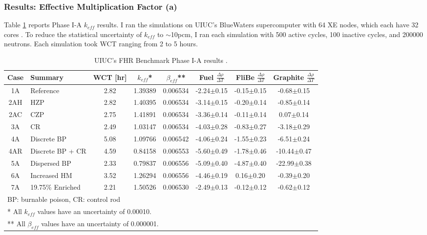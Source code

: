 \subsubsection{Results: Effective Multiplication Factor (a)}
\label{sec:fhr-benchmark-keff}
Table \ref{tab:phase1a-results} reports Phase I-A $k_{eff}$ results. 
I ran the simulations on \gls{UIUC}'s BlueWaters supercomputer with 64 XE nodes, 
which each have 32 cores \cite{ncsa_about_2017}. 
To reduce the statistical uncertainty of $k_{eff}$ to $\sim$10pcm, I ran each 
simulation with 500 active cycles, 100 inactive cycles, and 200000 neutrons. 
Each simulation took \gls{WCT} ranging from 2 to 5 hours. 
\begin{table}[htbp]
    \centering
    \onehalfspacing
    \caption{\gls{UIUC}'s \acrlong{FHR} Benchmark Phase I-A results 
    \cite{chee_arfcfhr-benchmark_2021}.}
	\label{tab:phase1a-results}
    \footnotesize
    \begin{tabular}{cp{2.7cm}cccccc}
    \hline
    \textbf{Case} & \textbf{Summary} & \textbf{WCT [hr]} & \textbf{$k_{eff}$}* & 
    \textbf{$\beta_{eff}$}** & 
    \textbf{Fuel} $\frac{\Delta \rho}{\Delta T}$ & 
    \textbf{FliBe} $\frac{\Delta \rho}{\Delta T}$ & 
    \textbf{Graphite} $\frac{\Delta \rho}{\Delta T}$\\
    \hline 
    1A & Reference &2.82&1.39389 & 0.006534 & -2.24$\pm$0.15 & -0.15$\pm$0.15 & -0.68$\pm$0.15\\
    2AH & \gls{HZP} &2.82&1.40395 & 0.006534 & -3.14$\pm$0.15 & -0.20$\pm$0.14 & -0.85$\pm$0.14\\
    2AC & \gls{CZP} &2.75&1.41891 & 0.006534 & -3.36$\pm$0.14 & -0.11$\pm$0.14 & 0.07$\pm$0.14\\
    3A & CR &2.49&1.03147 & 0.006534 & -4.03$\pm$0.28 & -0.83$\pm$0.27 & -3.18$\pm$0.29\\
    4A & Discrete BP &5.08&1.09766 & 0.006542 & -4.06$\pm$0.24 & -1.55$\pm$0.23 & -6.51$\pm$0.24\\
    4AR & Discrete BP + CR &4.59&0.84158 & 0.006553 & -5.60$\pm$0.49 & -1.78$\pm$0.46 & -10.44$\pm$0.47\\
    5A & Dispersed BP &2.33&0.79837 & 0.006556 & -5.09$\pm$0.40 & -4.87$\pm$0.40 & -22.99$\pm$0.38\\
    6A & Increased \gls{HM} &3.52&1.26294 & 0.006556 & -4.46$\pm$0.19 & 0.16$\pm$0.20 & -0.39$\pm$0.20\\
    7A & 19.75\% Enriched &2.21&1.50526 & 0.006530 & -2.49$\pm$0.13 & -0.12$\pm$0.12 & -0.62$\pm$0.12\\
    \hline
    \multicolumn{5}{l}{BP: burnable poison, CR: control rod} \\
    \multicolumn{5}{l}{* All $k_{eff}$ values have an uncertainty of 0.00010.} \\
    \multicolumn{5}{l}{** All $\beta_{eff}$ values have an uncertainty of 0.000001.}
    \end{tabular}
\end{table}

